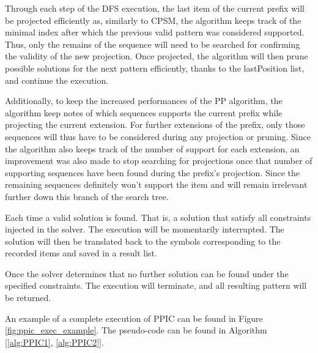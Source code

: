 \documentclass{eplmastersthesis}
\begin{document}
\begin{enumerate}
Through each step of the DFS execution, the last item of the current prefix will be projected efficiently as, similarly to CPSM, the algorithm keeps track of the minimal index after which the previous valid pattern was considered supported. Thus, only the remains of the sequence will need to be searched for confirming the validity of the new projection. Once projected, the algorithm will then prune possible solutions for the next pattern efficiently, thanks to the lastPosition list, and continue the execution. 

Additionally, to keep the increased performances of the PP algorithm, the algorithm keep notes of which sequences supports the current prefix while projecting the current extension. For further extensions of the prefix, only those sequences will thus have to be considered during any projection or pruning. Since the algorithm also keeps track of the number of support for each extension, an improvement was also made to stop searching for projections once that number of supporting sequences have been found during the prefix's projection. Since the remaining sequences definitely won't support the item and will remain irrelevant further down this branch of the search tree. \newline

Each time a valid solution is found. That is, a solution that satisfy all constraints injected in the solver. The execution will be momentarily interrupted. The solution will then be translated back to the symbols corresponding to the recorded items and saved in a result list. \newline

Once the solver determines that no further solution can be found under the specified constraints. The execution will terminate, and all resulting pattern will be returned.
\end{enumerate}

An example of a complete execution of PPIC can be found in Figure \ref{fig:ppic_exec_example}. The pseudo-code can be found in Algorithm [\ref{alg:PPIC1}, \ref{alg:PPIC2}]. \newline
\end{document}
